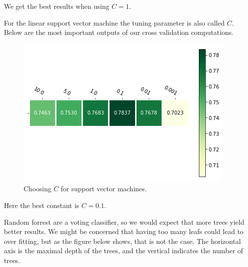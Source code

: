 \documentclass[parskip=half]{scrartcl}
\theoremstyle{definition}
\theoremstyle{remark}
\begin{document}
We get the best results when using $C=1$.

For the linear support vector machine the tuning parameter is also called $C$. 
Below are the most important outputs of our cross validation computations. 

\begin{figure}[H]
\caption{Choosing $C$ for support vector machines.}
\centering
\includegraphics[scale=0.6]{images/linear_svm_params.png}
\end{figure}

Here the best constant is $C = 0.1$.

Random forrest are a voting classifier, so we would expect that more trees yield better results. 
We might be concerned that having too many leafs could lead to over fitting, but as the figure below shows, that is not the case. 
The horizontal axis is the maximal depth of the trees, and the vertical indicates the number of trees. 
 
\end{document}
